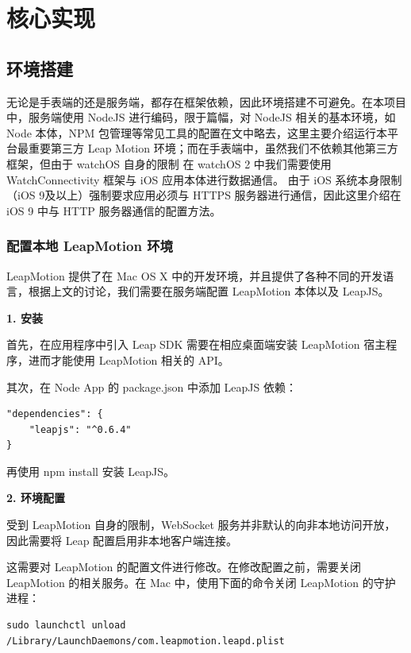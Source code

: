 \chapter{核心实现}

\section{环境搭建}

无论是手表端的还是服务端，都存在框架依赖，因此环境搭建不可避免。在本项目中，服务端使用 NodeJS 进行编码，限于篇幅，对 NodeJS 相关的基本环境，如 Node 本体，NPM 包管理等常见工具的配置在文中略去，这里主要介绍运行本平台最重要第三方 Leap Motion 环境；而在手表端中，虽然我们不依赖其他第三方框架，但由于 watchOS 自身的限制\cite{WatchConnectivity:2016} 在 watchOS 2 中我们需要使用 WatchConnectivity 框架与 iOS 应用本体进行数据通信。
由于 iOS 系统本身限制（iOS 9及以上）强制要求应用必须与 HTTPS 服务器进行通信，因此这里介绍在 iOS 9 中与 HTTP 服务器通信的配置方法。

\subsection{配置本地 LeapMotion 环境}

LeapMotion 提供了在 Mac OS X 中的开发环境，并且提供了各种不同的开发语言，根据上文的讨论，我们需要在服务端配置 LeapMotion 本体以及 LeapJS。

\textbf{1. 安装}

首先，在应用程序中引入 Leap SDK 需要在相应桌面端安装 LeapMotion 宿主程序，进而才能使用 LeapMotion 相关的 API。

其次，在 Node App 的 package.json 中添加 LeapJS 依赖：
\begin{lstlisting}[frame=trBL,frameround=fttt,rulesepcolor=\color{White},numbers=none]
"dependencies": {
    "leapjs": "^0.6.4"
}
\end{lstlisting}
再使用 npm install 安装 LeapJS。

\textbf{2. 环境配置}

受到 LeapMotion 自身的限制\cite{Leap:2016}，WebSocket 服务并非默认的向非本地访问开放，因此需要将 Leap 配置启用非本地客户端连接。

这需要对 LeapMotion 的配置文件进行修改。在修改配置之前，需要关闭 LeapMotion 的相关服务。在 Mac 中，使用下面的命令关闭 LeapMotion 的守护进程：
\begin{lstlisting}[frame=trBL,frameround=fttt,rulesepcolor=\color{White},numbers=none]
sudo launchctl unload /Library/LaunchDaemons/com.leapmotion.leapd.plist
\end{lstlisting}

